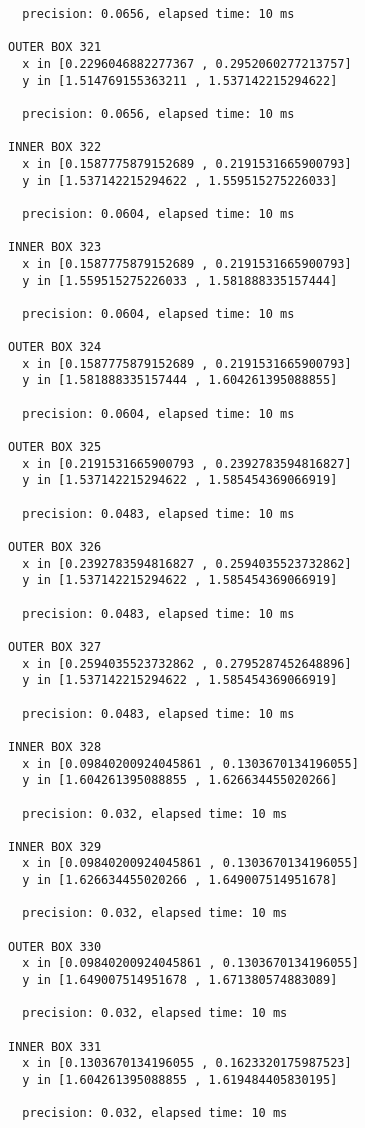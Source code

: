 \begin{verbatim}
  precision: 0.0656, elapsed time: 10 ms

OUTER BOX 321
  x in [0.2296046882277367 , 0.2952060277213757]
  y in [1.514769155363211 , 1.537142215294622]

  precision: 0.0656, elapsed time: 10 ms

INNER BOX 322
  x in [0.1587775879152689 , 0.2191531665900793]
  y in [1.537142215294622 , 1.559515275226033]

  precision: 0.0604, elapsed time: 10 ms

INNER BOX 323
  x in [0.1587775879152689 , 0.2191531665900793]
  y in [1.559515275226033 , 1.581888335157444]

  precision: 0.0604, elapsed time: 10 ms

OUTER BOX 324
  x in [0.1587775879152689 , 0.2191531665900793]
  y in [1.581888335157444 , 1.604261395088855]

  precision: 0.0604, elapsed time: 10 ms

OUTER BOX 325
  x in [0.2191531665900793 , 0.2392783594816827]
  y in [1.537142215294622 , 1.585454369066919]

  precision: 0.0483, elapsed time: 10 ms

OUTER BOX 326
  x in [0.2392783594816827 , 0.2594035523732862]
  y in [1.537142215294622 , 1.585454369066919]

  precision: 0.0483, elapsed time: 10 ms

OUTER BOX 327
  x in [0.2594035523732862 , 0.2795287452648896]
  y in [1.537142215294622 , 1.585454369066919]

  precision: 0.0483, elapsed time: 10 ms

INNER BOX 328
  x in [0.09840200924045861 , 0.1303670134196055]
  y in [1.604261395088855 , 1.626634455020266]

  precision: 0.032, elapsed time: 10 ms

INNER BOX 329
  x in [0.09840200924045861 , 0.1303670134196055]
  y in [1.626634455020266 , 1.649007514951678]

  precision: 0.032, elapsed time: 10 ms

OUTER BOX 330
  x in [0.09840200924045861 , 0.1303670134196055]
  y in [1.649007514951678 , 1.671380574883089]

  precision: 0.032, elapsed time: 10 ms

INNER BOX 331
  x in [0.1303670134196055 , 0.1623320175987523]
  y in [1.604261395088855 , 1.619484405830195]

  precision: 0.032, elapsed time: 10 ms


\end{verbatim}
